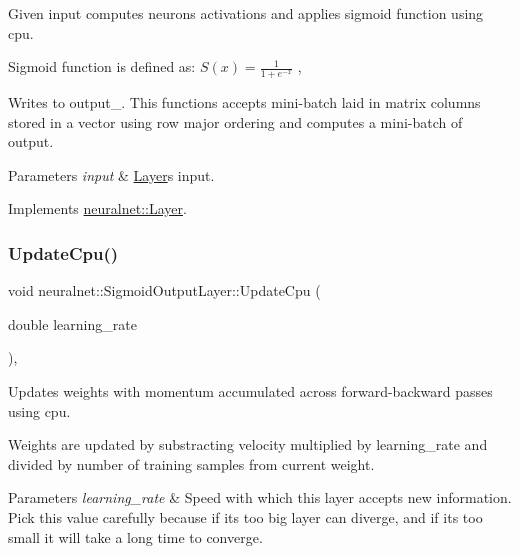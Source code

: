 Given input computes neurons\textquotesingle{} activations and applies sigmoid function using cpu. 

Sigmoid function is defined as\+: $S(x) = \frac{1}{{1 + e^{-x}}}$ ,

Writes to output\+\_\+. This functions accepts mini-\/batch laid in matrix columns stored in a vector using row major ordering and computes a mini-\/batch of output.


\begin{DoxyParams}{Parameters}
{\em input} & \hyperlink{classneuralnet_1_1Layer}{Layer}\textquotesingle{}s input. \\
\hline
\end{DoxyParams}


Implements \hyperlink{classneuralnet_1_1Layer_abd0fdf1146eb28485349337e68ad7982}{neuralnet\+::\+Layer}.

\mbox{\label{classneuralnet_1_1SigmoidOutputLayer_acb41e05e0cbf78f2498b39ea4e4bedb0}} 
\subsubsection{\texorpdfstring{Update\+Cpu()}{UpdateCpu()}}
{\footnotesize\ttfamily void neuralnet\+::\+Sigmoid\+Output\+Layer\+::\+Update\+Cpu (\begin{DoxyParamCaption}\item[{double}]{learning\+\_\+rate }\end{DoxyParamCaption})\hspace{0.3cm}{\ttfamily [protected]}, {\ttfamily [virtual]}}



Updates weights with momentum accumulated across forward-\/backward passes using cpu. 

Weights are updated by substracting velocity multiplied by learning\+\_\+rate and divided by number of training samples from current weight.


\begin{DoxyParams}{Parameters}
{\em learning\+\_\+rate} & Speed with which this layer accepts new information. Pick this value carefully because if it\textquotesingle{}s too big layer can diverge, and if it\textquotesingle{}s too small it will take a long time to converge. \\
\hline
\end{DoxyParams}

